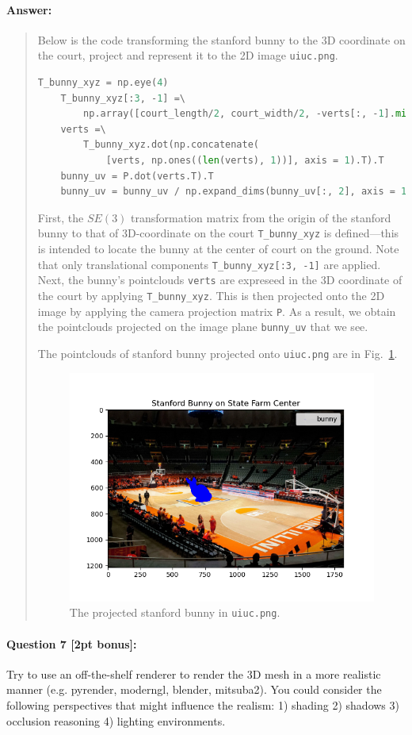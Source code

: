 \documentclass[11pt]{article}
\begin{document}
\paragraph{Answer:} 
\begin{quote}
    Below is the code transforming the stanford bunny to the 3D coordinate on the court, project and represent it to the 2D image \texttt{uiuc.png}.
    \begin{lstlisting}[language=Python]
    T_bunny_xyz = np.eye(4)
    T_bunny_xyz[:3, -1] =\
        np.array([court_length/2, court_width/2, -verts[:, -1].min()])
    verts =\
        T_bunny_xyz.dot(np.concatenate(
            [verts, np.ones((len(verts), 1))], axis = 1).T).T
    bunny_uv = P.dot(verts.T).T
    bunny_uv = bunny_uv / np.expand_dims(bunny_uv[:, 2], axis = 1)
    \end{lstlisting}
    
    First, the $SE(3)$ transformation matrix from the origin of the stanford bunny to that of 3D-coordinate on the court \verb|T_bunny_xyz| is defined---this is intended to locate the bunny at the center of court on the ground. Note that only translational components \verb|T_bunny_xyz[:3, -1]| are applied. Next, the bunny's pointclouds \verb|verts| are expreseed in the 3D coordinate of the court by applying \verb|T_bunny_xyz|. This is then projected onto the 2D image by applying the camera projection matrix \verb|P|. As a result, we obtain the pointclouds projected on the image plane \verb|bunny_uv| that we see.

    The pointclouds of stanford bunny projected onto \texttt{uiuc.png} are in Fig.~\ref{fig:projection_bunny}.
    \begin{figure}[h]
        \centering
        \includegraphics[width=0.7\linewidth]{Q6.png}
        \caption{The projected stanford bunny in \texttt{uiuc.png}.}
        \label{fig:projection_bunny}
    \end{figure}
\end{quote}

\paragraph{Question 7 [2pt bonus]:} Try to use an off-the-shelf renderer to render the 3D mesh in a more realistic manner (e.g. pyrender, moderngl, blender, mitsuba2). You could consider the following perspectives that might influence the realism: 1) shading 2) shadows 3) occlusion reasoning 4) lighting environments. 
\end{document}
